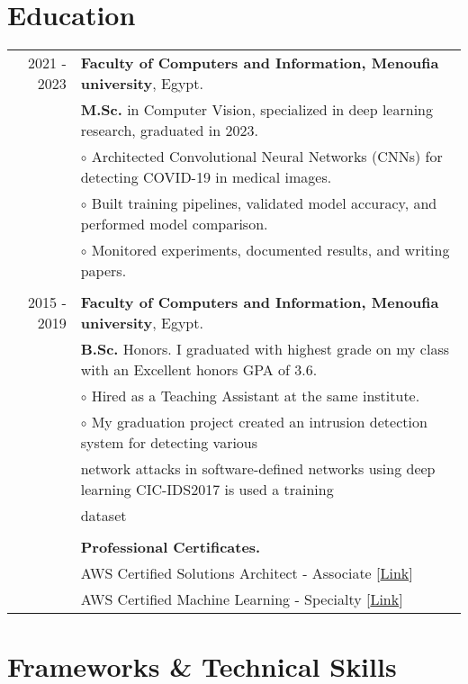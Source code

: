 \documentclass[a4paper,10pt]{article}
\begin{document}
\section{\textbf{Education}}
\begin{longtable}{r|l}
    2021 - 2023  & \textbf{Faculty of Computers and Information, Menoufia university}, Egypt.\\ & 
    \textbf{M.Sc.} in Computer Vision, specialized in deep learning research, graduated in 2023. \\ &
    $\circ$ Architected Convolutional Neural Networks (CNNs) for detecting COVID-19 in medical images. \\ &
    $\circ$ Built training pipelines, validated model accuracy, and performed model comparison. \\ &   
    $\circ$ Monitored experiments, documented results, and writing papers. \\
    &\\
    2015 - 2019 & \textbf{Faculty of Computers and Information, Menoufia university}, Egypt. \\ & 
    \textbf{B.Sc.} Honors. I graduated with highest grade on my class with an Excellent honors GPA of 3.6. \\ &
    $\circ$ Hired as a Teaching Assistant at the same institute. \\ &
    $\circ$ My graduation project created an intrusion detection system for detecting various \\ & network attacks in software-defined networks using deep learning CIC-IDS2017 is used a training \\ & dataset\\
    &\\
    & \textbf{Professional Certificates.} \\
    & AWS Certified Solutions Architect - Associate [\href{https://cp.certmetrics.com/amazon/en/public/verify/credential/8ff7ef944a1c49cf873b541903d9cbc3}{Link}] \\
    & AWS Certified Machine Learning - Specialty [\href{https://cp.certmetrics.com/amazon/en/public/verify/credential/b5b06f594c0a45929e1971bf5215daf7}{Link}] \\
\end{longtable}


\section{\textbf{Frameworks \& Technical Skills}}
\end{document}
